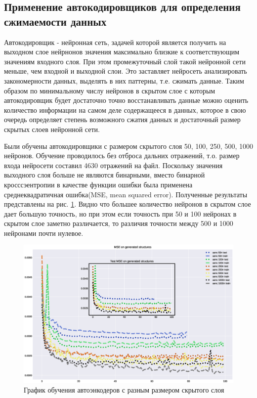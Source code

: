 \documentclass{article}
\begin{document}
\subsection{Применение автокодировщиков для определения сжимаемости данных}

Автокодировщик - нейронная сеть, задачей которой является получить на выходном слое нейрнонов значения максимально близкие к соответствующим значениям входного слоя. При этом промежуточный слой такой нейронной сети меньше, чем входной и выходной слои. Это заставляет нейросеть анализировать закономерности данных, выделять в них паттерны, т.е. сжимать данные. Таким образом по минимальному числу нейронов в скрытом слое с которым автокодировщик будет достаточно точно восстанавливать данные можно оценить количество информации на самом деле содержащееся в данных, которое в свою очередь определяет степень возможного сжатия данных и достаточный размер скрытых слоев нейронной сети.

Были обучены автокодировщики с размером скрытого слоя 50, 100, 250, 500, 1000 нейронов. Обучение проводилось без отброса дальних отражений, т.о. размер входа нейросети составил 4630 отражений на файл. Поскольку значения выходного слоя больше не являются бинарными, вместо бинарной кросссэентропии в качестве функции ошибки была применена среднеквадратичная ошибка(MSE, mean squared error). Полученные результаты представлены на рис. \ref{fig:loss_aenc}. Видно что большее количество нейронов в скрытом слое дает большую точность, но при этом если точность при 50 и 100 нейронах в скрытом слое заметно различается, то различия точности между 500 и 1000 нейронами почти нулевое.

\begin{figure}[htp]
\centering
\includegraphics[scale=0.30]{imgs/loss-aenc.eps}
\caption{График обучения автоэнкодеров с разным размером скрытого слоя}
\label{fig:loss_aenc}
\end{figure}
\end{document}
